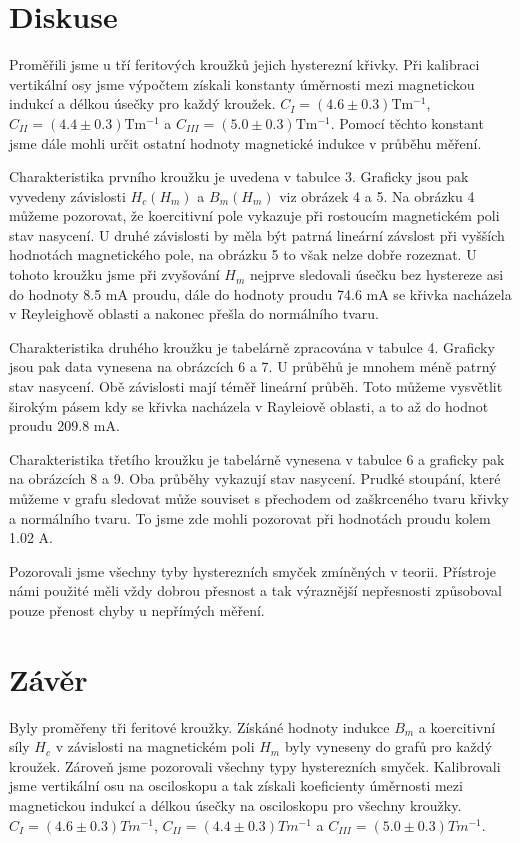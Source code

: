 \documentclass{article}
\begin{document}
\section{Diskuse}
\par  Proměřili jsme u tří feritových kroužků jejich hysterezní křivky. Při kalibraci vertikální osy jsme výpočtem získali konstanty úměrnosti mezi magnetickou indukcí a délkou úsečky pro každý kroužek. $C_{I} = (4.6 \pm 0.3)\mathrm{Tm^{-1}}$, $C_{II} = (4.4 \pm 0.3)\mathrm{Tm^{-1}}$ a $C_{III} = (5.0 \pm 0.3)\mathrm{Tm^{-1}}$. Pomocí těchto konstant jsme dále mohli určit ostatní hodnoty magnetické indukce v průběhu měření. 
\par Charakteristika prvního kroužku je uvedena v tabulce 3. Graficky jsou pak vyvedeny závislosti $H_c(H_m)$ a $B_m(H_m)$ viz obrázek 4 a 5. Na obrázku 4 můžeme pozorovat, že koercitivní pole vykazuje při rostoucím magnetickém poli stav nasycení. U druhé závislosti by měla být patrná lineární závslost při vyšších hodnotách magnetického pole, na obrázku 5 to však nelze dobře rozeznat. U tohoto kroužku jsme při zvyšování $H_m$ nejprve sledovali úsečku bez hystereze asi do hodnoty 8.5 mA proudu, dále do hodnoty proudu 74.6 mA se křivka nacházela v Reyleighově oblasti a nakonec přešla do normálního tvaru.
\par Charakteristika druhého kroužku je tabelárně zpracována v tabulce 4. Graficky jsou pak data vynesena na obrázcích 6 a 7. U průběhů je mnohem méně patrný stav nasycení. Obě závislosti mají téměř lineární průběh. Toto můžeme vysvětlit širokým pásem kdy se křivka nacházela v Rayleiově oblasti, a to až do hodnot proudu 209.8 mA. 
\par Charakteristika třetího kroužku je tabelárně vynesena v tabulce 6 a graficky pak na obrázcích 8 a 9. Oba průběhy vykazují stav nasycení. Prudké stoupání, které můžeme v grafu sledovat může souviset s přechodem od zaškrceného tvaru křivky a normálního tvaru. To jsme zde mohli pozorovat při hodnotách proudu kolem 1.02 A. 
\par Pozorovali jsme všechny tyby hysterezních smyček zmíněných v teorii. Přístroje námi použité měli vždy dobrou přesnost a tak výraznější nepřesnosti způsoboval pouze přenost chyby u nepřímých měření. 





\section{Závěr}
\par Byly proměřeny tři feritové kroužky. Získáné hodnoty indukce $B_m$ a koercitivní síly $H_c$ v závislosti na magnetickém poli $H_m$ byly vyneseny do grafů pro každý kroužek. Zároveň jsme pozorovali všechny typy hysterezních smyček. Kalibrovali jsme vertikální osu na osciloskopu a tak získali koeficienty úměrnosti mezi magnetickou indukcí a délkou úsečky na osciloskopu pro všechny kroužky. $C_{I} = (4.6 \pm 0.3)Tm^{-1}$, $C_{II} = (4.4 \pm 0.3)Tm^{-1}$ a $C_{III} = (5.0 \pm 0.3)Tm^{-1}$.  
\end{document}

